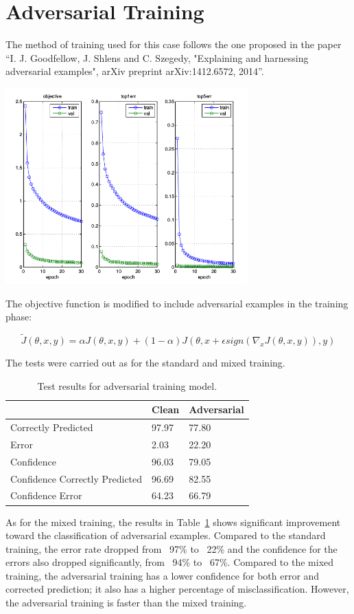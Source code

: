 \section{Adversarial Training}

The method of training used for this case follows the one proposed in the paper “I. J. Goodfellow, J. Shlens and C. Szegedy, "Explaining and harnessing adversarial examples", arXiv preprint arXiv:1412.6572, 2014”.

\begin{center}
  \includegraphics[width=0.7\textwidth]{img/train-adv.png}
	\label{train-mix} 
\end{center}

The objective function is modified to include adversarial examples in the training phase:

$$ 	\tilde{J}(\theta, x, y) = \alpha J(\theta, x, y) + ( 1 - \alpha)J(\theta, x + \epsilon sign(\nabla_{x}J(\theta, x, y)), y) $$

The tests were carried out as for the standard and mixed training.

\FloatBarrier
\begin{table}[h]
\centering
\begin{tabular}{@{}lll@{}}
\toprule
                               & Clean & Adversarial \\ \midrule
Correctly Predicted            & 97.97 & 77.80       \\
Error                          & 2.03  & 22.20       \\
Confidence                     & 96.03 & 79.05       \\
Confidence Correctly Predicted & 96.69 & 82.55       \\
Confidence Error               & 64.23 & 66.79       \\ \bottomrule
\end{tabular}
\caption{Test results for adversarial training model.}
\label{adv-test}
\end{table}
\FloatBarrier

As for the mixed training, the results in Table~\ref{adv-test} shows significant improvement toward the classification of adversarial examples. Compared to the standard training, the error rate dropped from ~97\% to ~22\% and the confidence for the errors also dropped significantly, from ~94\% to ~67\%.
Compared to the mixed training, the adversarial training has a lower confidence for both error and corrected prediction; it also has a higher percentage of misclassification. However, the adversarial training is faster than the mixed training.
